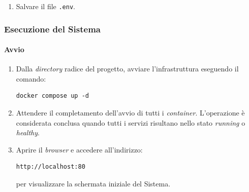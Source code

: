 \documentclass[10pt, letterpaper]{article}
\begin{document}
\begin{enumerate}
\begin{itemize}
    \item \textbf{Webhook e sottoscrizioni}
    \begin{itemize}
        \item \texttt{SECRET\_FOR\_SUB}: Secret per la gestione delle sottoscrizioni;
        \item \texttt{NODE\_SUB\_CALLBACK}: Endpoint interno callback per le sottoscrizioni;
        \item \texttt{DATAPOINT\_SUB\_CALLBACK}: Endpoint interno callback per aggiornamenti datapoint.
    \end{itemize}

    \item \textbf{Integrazioni esterne}
    \begin{itemize}
        \item \texttt{GROQ\_API\_KEY}: API key per integrazione con servizi Groq.
    \end{itemize}

\end{itemize}

\item Salvare il file \texttt{.env}.
\end{enumerate}

\subsubsection{Esecuzione del Sistema}

\paragraph{Avvio}
\label{sec:avvio}

\begin{enumerate}
    \item Dalla \textit{directory} radice del progetto, avviare l'infrastruttura eseguendo il comando:
\begin{verbatim}
docker compose up -d
\end{verbatim}

    \item Attendere il completamento dell'avvio di tutti i \textit{container}. L'operazione è considerata conclusa quando tutti i servizi risultano nello stato \textit{running} o \textit{healthy}.

    \item Aprire il \textit{browser} e accedere all'indirizzo:
\begin{verbatim}
http://localhost:80
\end{verbatim}
per visualizzare la schermata iniziale del Sistema.
\end{enumerate}
\end{document}
